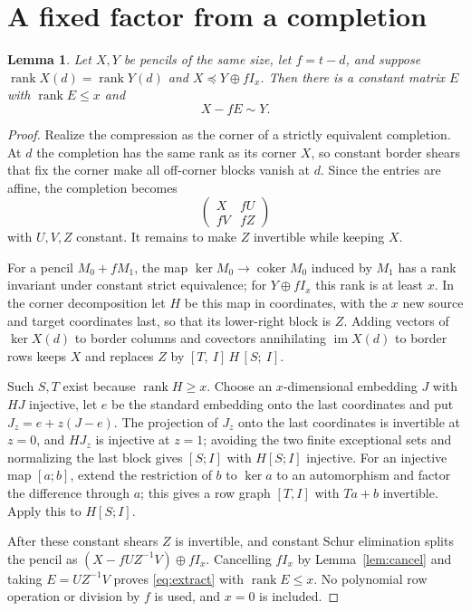\documentclass[11pt]{article}
\newtheorem{lemma}{Lemma}
\newcommand{\rk}{\operatorname{rank}}
\newcommand{\im}{\operatorname{im}}
\newcommand{\cmp}{\preceq}
\begin{document}
\section{A fixed factor from a completion}\label{sec:extract}

\begin{lemma}\label{lem:extract}
Let $X,Y$ be pencils of the same size, let $f=t-d$, and suppose $\rk X(d)=\rk Y(d)$ and $X\cmp Y\oplus fI_x$. Then there is a constant matrix $E$ with $\rk E\le x$ and
\begin{equation}\label{eq:extract}
X-fE\sim Y.
\end{equation}
\end{lemma}

\begin{proof}
Realize the compression as the corner of a strictly equivalent completion. At $d$ the completion has the same rank as its corner $X$, so constant border shears that fix the corner make all off-corner blocks vanish at $d$. Since the entries are affine, the completion becomes
\[
\begin{pmatrix}X&fU\\ fV&fZ\end{pmatrix}
\]
with $U,V,Z$ constant. It remains to make $Z$ invertible while keeping $X$.

For a pencil $M_0+fM_1$, the map $\ker M_0\to\operatorname{coker}M_0$ induced by $M_1$ has a rank invariant under constant strict equivalence; for $Y\oplus fI_x$ this rank is at least $x$. In the corner decomposition let $H$ be this map in coordinates, with the $x$ new source and target coordinates last, so that its lower-right block is $Z$. Adding vectors of $\ker X(d)$ to border columns and covectors annihilating $\im X(d)$ to border rows keeps $X$ and replaces $Z$ by $[T,\ I]\,H\,[S;\ I]$.

Such $S,T$ exist because $\rk H\ge x$. Choose an $x$-dimensional embedding $J$ with $HJ$ injective, let $e$ be the standard embedding onto the last coordinates and put $J_z=e+z(J-e)$. The projection of $J_z$ onto the last coordinates is invertible at $z=0$, and $HJ_z$ is injective at $z=1$; avoiding the two finite exceptional sets and normalizing the last block gives $[S;I]$ with $H[S;I]$ injective. For an injective map $[a;b]$, extend the restriction of $b$ to $\ker a$ to an automorphism and factor the difference through $a$; this gives a row graph $[T,I]$ with $Ta+b$ invertible. Apply this to $H[S;I]$.

After these constant shears $Z$ is invertible, and constant Schur elimination splits the pencil as $(X-fUZ^{-1}V)\oplus fI_x$. Cancelling $fI_x$ by Lemma~\ref{lem:cancel} and taking $E=UZ^{-1}V$ proves \eqref{eq:extract} with $\rk E\le x$. No polynomial row operation or division by $f$ is used, and $x=0$ is included.
\end{proof}
\end{document}
